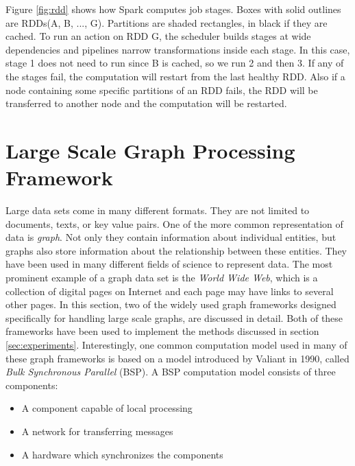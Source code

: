\documentclass[english]{tktltiki}
\begin{document}
Figure \ref{fig:rdd} shows how Spark computes job stages. Boxes with solid outlines are RDDs(A, B, ..., G). Partitions are shaded rectangles, in black if they are cached. To run an action on RDD G, the scheduler builds stages at wide dependencies and pipelines narrow transformations inside each stage. In this case, stage 1 does not need to run since B is cached, so we run 2 and then 3. If any of the stages fail, the computation will restart from the last healthy RDD. Also if a node containing some specific partitions of an RDD fails, the RDD will be transferred to another node and the computation will be restarted. 

\newpage

\section{Large Scale Graph Processing Framework}
\label{sec:biggraph}
Large data sets come in many different formats. They are not limited to documents, texts, or key value pairs. One of the more common representation of data is \textit{graph}. Not only they contain information about individual entities, but graphs also store information about the relationship between these entities. They have been used in many different fields of science to represent data. The most prominent example of a graph data set is the \textit{World Wide Web}, which is a collection of digital pages on Internet and each page may have links to several other pages. In this section, two of the widely used graph frameworks designed specifically for handling large scale graphs, are discussed in detail. Both of these frameworks have been used to implement the methods discussed in section \ref{sec:experiments}. Interestingly, one common computation model used in many of these graph frameworks is based on a model introduced by Valiant \cite{valiant90} in 1990, called \textit{Bulk Synchronous Parallel} (BSP). A BSP computation model consists of three components: 
\begin{itemize}
\item
A component capable of local processing
\item
A network for transferring messages
\item
A hardware which synchronizes the components
\end{itemize}
\end{document}
